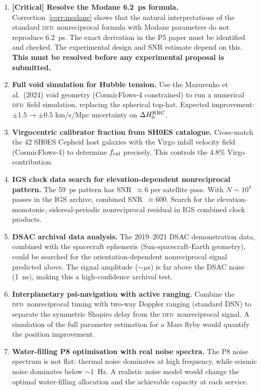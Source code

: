 \documentclass[aps,prd,twocolumn,superscriptaddress,nofootinbib,longbibliography]{revtex4-2}
\newcommand{\DFD}{\textsc{dfd}}
\begin{document}
\begin{enumerate}

\item \textbf{[Critical] Resolve the Modane 6.2~ps formula.}
Correction~\ref{corr:modane} shows that the natural interpretations
of the standard \DFD\ nonreciprocal formula with Modane parameters
do not reproduce 6.2~ps.  The exact derivation in the P5 paper
must be identified and checked.  The experimental design
and SNR estimate depend on this.  \textbf{This must be resolved
before any experimental proposal is submitted.}

\item \textbf{Full void simulation for Hubble tension.}
Use the Mazurenko et al.\ (2024) void geometry (CosmicFlows-4
constrained) to run a numerical \DFD\ field simulation,
replacing the spherical top-hat.  Expected improvement:
$\pm1.5\to\pm0.5$ km/s/Mpc uncertainty on $\Delta H_0^{\rm KBC}$.

\item \textbf{Virgocentric calibrator fraction from SH0ES catalogue.}
Cross-match the 42 SH0ES Cepheid host galaxies with the Virgo
infall velocity field (CosmicFlows-4) to determine $f_{\rm cal}$
precisely.  This controls the 4.8\% Virgo contribution.

\item \textbf{IGS clock data search for elevation-dependent nonreciprocal pattern.}
The 59~ps pattern has SNR~$\approx 6$ per satellite pass.  With
$N\sim10^4$ passes in the IGS archive, combined SNR~$\approx 600$.
Search for the elevation-monotonic, sidereal-periodic nonreciprocal
residual in IGS combined clock products.

\item \textbf{DSAC archival data analysis.}
The 2019--2021 DSAC demonstration data, combined with the spacecraft
ephemeris (Sun-spacecraft-Earth geometry), could be searched for
the orientation-dependent nonreciprocal signal predicted above.
The signal amplitude ($\sim\mu$s) is far above the DSAC noise
(1~ns), making this a high-confidence archival test.

\item \textbf{Interplanetary psi-navigation with active ranging.}
Combine the \DFD\ nonreciprocal timing with two-way Doppler ranging
(standard DSN) to separate the symmetric Shapiro delay from the
\DFD\ nonreciprocal signal.  A simulation of the full parameter
estimation for a Mars flyby would quantify the position improvement.

\item \textbf{Water-filling P8 optimisation with real noise spectra.}
The P8 noise spectrum is not flat: thermal noise dominates at
high frequency, while seismic noise dominates below $\sim$1~Hz.
A realistic noise model would change the optimal water-filling
allocation and the achievable capacity at each service.

\end{enumerate}
\end{document}
